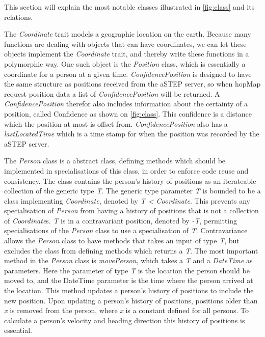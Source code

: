 This section will explain the most notable classes illustrated in \cref{fig:class} and its relations.

The \emph{Coordinate} trait models a geographic location on the earth. Because many functions are dealing with objects that can have coordinates, we can let these objects implement the \emph{Coordinate} trait, and thereby write these functions in a polymorphic way. One such object is the \emph{Position} class, which is essentially a coordinate for a person at a given time. \emph{ConfidencePosition} is designed to have the same structure as positions received from the aSTEP server, so when hopMap request position data a list of \emph{ConfidencePosition} will be returned. A \emph{ConfidencePosition} therefor also includes information about the certainty of a position, called Confidence as shown on \cref{fig:class}. This confidence is a distance which the position at most is offset from. \emph{ConfidencePosition} also has a \emph{lastLocatedTime} which is a time stamp for when the position was recorded by the aSTEP server.


The \emph{Person} class is a abstract class, defining methods which should be implemented in specialisations of this class, in order to enforce code reuse and consistency. The class contains the person's history of positions as an iterateable collection of the generic type \emph{T}. The generic type parameter \emph{T} is bounded to be a class implementing \emph{Coordinate}, denoted by \emph{T < Coordinate}. This prevents any specialisation of \emph{Person} from having a history of positions that is not a collection of \emph{Coordinate}s. \emph{T} is in a contravariant position, denoted by \emph{-T}, permitting specialisations of the \emph{Person} class to use a specialisation of \emph{T}. Contravariance allows the \emph{Person} class to have methods that takes an input of type \emph{T}, but excludes the class from defining methods which returns a \emph{T}. The most important method in the \emph{Person} class is \emph{movePerson}, which takes a \emph{T} and a \emph{DateTime} as parameters. Here the parameter of type \emph{T} is the location the person should be moved to, and the DateTime parameter is the time where the person arrived at the location. This method updates a person's history of positions to include the new position. Upon updating a person's history of positions, positions older than \emph{x} is removed from the person, where \emph{x} is a constant defined for all persons. To calculate a person's velocity and heading direction this history of positions is essential. 

